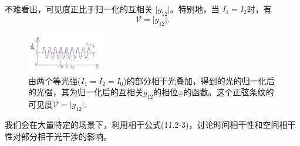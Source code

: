\documentclass[UTF8]{ctexart}
\numberwithin{figure}{subsection}
\numberwithin{table}{subsection}
\begin{document}
不难看出，可见度正比于归一化的互相关 $ \lvert g_{12} \rvert $。特别地，当 $ I_1 = I_2 $时，有
\begin{equation}
\mathcal{V} = \lvert g_{12} \rvert .
\end{equation}
 \begin{figure}[H]
\centering
\includegraphics[width=0.3\textwidth]{11_2_1.PNG}
\caption{由两个等光强($ I_1 = I_2 = I_0 $)的部分相干光叠加，得到的光的归一化后的光强，其为归一化后的互相关$ g_{12} $的相位$ \varphi $的函数。这个正弦条纹的可见度$ \mathcal{V} = \lvert g_{12} \rvert $.}
\label{fig: 11_2_1}
\end{figure}
\par 我们会在大量特定的场景下，利用相干公式(11.2-3)，讨论时间相干性和空间相干性对部分相干光干涉的影响。
 
\bigbreak\begingroup
\color{ksc}
\end{document}
